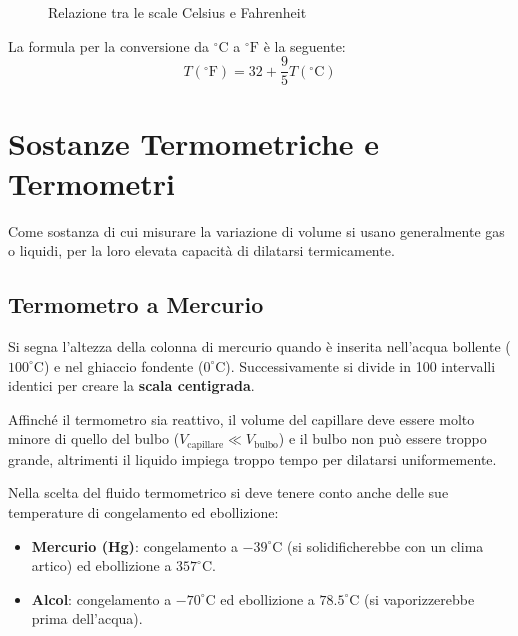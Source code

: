 \begin{figure}[ht]
    \centering
    \caption{Relazione tra le scale Celsius e Fahrenheit}
\end{figure}

\medskip
La formula per la conversione da $^\circ\text{C}$ a $^\circ\text{F}$ è la seguente:
\begin{equation}
    \boxed{T(^\circ\text{F}) = 32 + \frac{9}{5} T(^\circ\text{C})}
\end{equation}

\section{Sostanze Termometriche e Termometri}
Come sostanza di cui misurare la variazione di volume si usano generalmente gas o liquidi, per la loro elevata capacità di dilatarsi termicamente.

\subsection{Termometro a Mercurio}
Si segna l'altezza della colonna di mercurio quando è inserita nell'acqua bollente ($100^\circ\text{C}$) e nel ghiaccio fondente ($0^\circ\text{C}$). Successivamente si divide in 100 intervalli identici per creare la \textbf{scala centigrada}.

Affinché il termometro sia reattivo, il volume del capillare deve essere molto minore di quello del bulbo ($V_{\text{capillare}} \ll V_{\text{bulbo}}$) e il bulbo non può essere troppo grande, altrimenti il liquido impiega troppo tempo per dilatarsi uniformemente.

Nella scelta del fluido termometrico si deve tenere conto anche delle sue temperature di congelamento ed ebollizione:
\begin{itemize}
    \item \textbf{Mercurio (Hg)}: congelamento a $-39^\circ\text{C}$ (si solidificherebbe con un clima artico) ed ebollizione a $357^\circ\text{C}$.
    \item \textbf{Alcol}: congelamento a $-70^\circ\text{C}$ ed ebollizione a $78.5^\circ\text{C}$ (si vaporizzerebbe prima dell'acqua).
\end{itemize}

